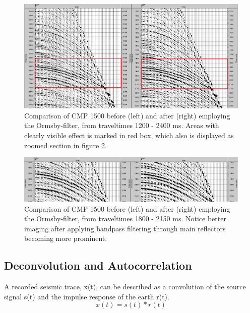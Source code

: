 \documentclass[10pt,a4paper]{article}
\begin{document}
\begin{figure}[H]
\includegraphics[width=\textwidth]{fig13.jpg}
\caption{Comparison of CMP 1500 before (left) and after (right) employing the Ormsby-filter, from traveltimes 1200 - 2400 ms. Areas with clearly visible effect is marked in red box, which also is displayed as zoomed section in figure \ref{fig14}.}
\label{fig13}
\end{figure}

\begin{figure}[H]
\includegraphics[width=\textwidth]{fig14.jpg}
\caption{Comparison of CMP 1500 before (left) and after (right) employing the Ormsby-filter, from traveltimes 1800 - 2150 ms. Notice better imaging after applying bandpass filtering through main reflectors becoming more prominent.}
\label{fig14}
\end{figure}

\subsection{Deconvolution and Autocorrelation}

A recorded seismic trace, x(t), can be described as a convolution of the source signal s(t) and the impulse response of the earth r(t).
$$
x(t) = s(t)*r(t)
$$
\end{document}
